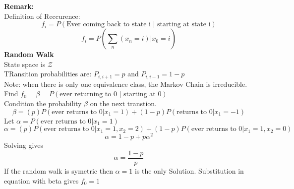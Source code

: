 \documentclass{article}
\begin{document}
\textbf{Remark:} \\
Definition of Reccurence:
$$ f_i = P(\text{Ever coming back to state i | starting at state i})$$
$$ f_i = P(\sum_n (x_n = i) | x_0 = i)$$
\textbf{Random Walk}\\
State space is $\mathscr{Z}$\\
TRansition probabilities are: $P_{i,i+1} = p$ and $P_{i,i-1} = 1-p $\\
Note: when there is only one equivalence class, the Markov Chain is irreducible.\\
Find $f_0 = \beta = P(\text{ever returning to 0 | starting at 0})$\\
Condition the probability $\beta$ on the next transtion.
$$\beta =  (p)P(\text{ever returns to 0} | x_1 = 1) + (1-p)P(\text{returns to 0} | x_1 = -1)$$
Let $\alpha = P(\text{ever returns to 0} | x_1 = 1)$\\
$ \alpha = (p)P(\text{ever returns to 0} | x_1 = 1, x_2 = 2) + (1-p)P(\text{ever returns to 0} | x_1 = 1, x_2 = 0)$\\
$$\alpha = 1 - p + p\alpha^2$$
Solving gives $$\alpha = \frac{1-p}{p}$$
If the random walk is symetric then $\alpha = 1$ is the only Solution. 
Substitution in equation with beta gives $f_0 = 1$\\
\end{document}
